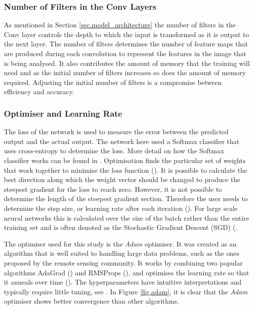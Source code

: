 \subsubsection{Number of Filters in the Conv Layers}
As mentioned in Section \ref{sec.model_architecture} the number of filters in the Conv layer controls the depth to which the input is transformed as it is output to the next layer. The number of filters determines the number of feature maps that are produced during each convolution to represent the features in the image that is being analysed. It also contributes the amount of memory that the training will need and as the initial number of filters increases so does the amount of memory required. Adjusting the initial number of filters is a compromise between efficiency and accuracy. 

\subsubsection{Optimiser and Learning Rate}
The loss of the network is used to measure the error between the predicted output and the actual output. The network here used a Softmax classifier that uses cross-entropy to determine the loss. More detail on how the Softmax classifier works can be found in \citet{Richmond19b}. Optimisation finds the particular set of weights that work together to minimise the loss function (\cite{Karpathy_opt}). It is possible to calculate the best direction along which the weight vector should be changed to produce the steepest gradient for the loss to reach zero. However, it is not possible to determine the length of the steepest gradient section. Therefore the user needs to determine the step size, or learning rate after each iteration (\cite{Karpathy_opt}). For large scale neural networks this is calculated over the size of the batch rather than the entire training set and is often denoted as the Stochastic Gradient Descent (SGD) (\cite{Bottou98,Sutskever13}.
\par 
The optimiser used for this study is the \textit{Adam} optimiser. It was created as an algorithm that is well suited to handling large data problems, such as the ones proposed by the remote sensing community. It works by combining two popular algorithms AdaGrad (\cite{duchi11}) and RMSProps (\cite{tielman12}), and optimises the learning rate so that it anneals over time (\cite{kingma14}). The hyperparameters have intuitive interpretations and typically require little tuning, see \citet{kingma14}. In Figure \ref{fig.adam}, it is clear that the \textit{Adam} optimiser shows better convergence than other algorithms.

